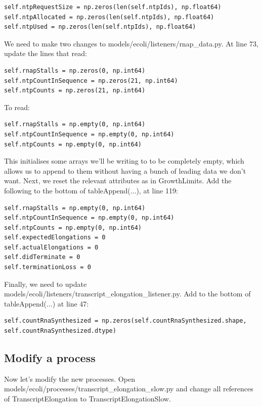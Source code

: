 \documentclass[12pt]{article}
\begin{document}
\lstset{language=Python}
\begin{lstlisting}
self.ntpRequestSize = np.zeros(len(self.ntpIds), np.float64)
self.ntpAllocated = np.zeros(len(self.ntpIds), np.float64)
self.ntpUsed = np.zeros(len(self.ntpIds), np.float64)
\end{lstlisting}

We need to make two changes to models/ecoli/listeners/rnap_data.py. At line 73, update the lines that read:
\lstset{language=Python}
\begin{lstlisting}
self.rnapStalls = np.zeros(0, np.int64)
self.ntpCountInSequence = np.zeros(21, np.int64)
self.ntpCounts = np.zeros(21, np.int64)
\end{lstlisting}

To read:
\lstset{language=Python}
\begin{lstlisting}
self.rnapStalls = np.empty(0, np.int64)
self.ntpCountInSequence = np.empty(0, np.int64)
self.ntpCounts = np.empty(0, np.int64)
\end{lstlisting}

This initialises some arrays we'll be writing to to be completely empty, which allows us to append to them without having a bunch of leading data we don't want. Next, we reset the relevant attributes as in GrowthLimits. Add the following to the bottom of tableAppend(...), at line 119:
\lstset{language=Python}
\begin{lstlisting}
self.rnapStalls = np.empty(0, np.int64)
self.ntpCountInSequence = np.empty(0, np.int64)
self.ntpCounts = np.empty(0, np.int64)
self.expectedElongations = 0
self.actualElongations = 0
self.didTerminate = 0
self.terminationLoss = 0
\end{lstlisting}

Finally, we need to update models/ecoli/listeners/transcript_elongation_listener.py. Add to the bottom of tableAppend(...) at line 47:
\lstset{language=Python}
\begin{lstlisting}
self.countRnaSynthesized = np.zeros(self.countRnaSynthesized.shape, self.countRnaSynthesized.dtype)
\end{lstlisting}

\subsection{Modify a process}

Now let’s modify the new processes. Open models/ecoli/processes/transcript\_elongation\_slow.py and change all references of TranscriptElongation to TranscriptElongationSlow.
\end{document}
